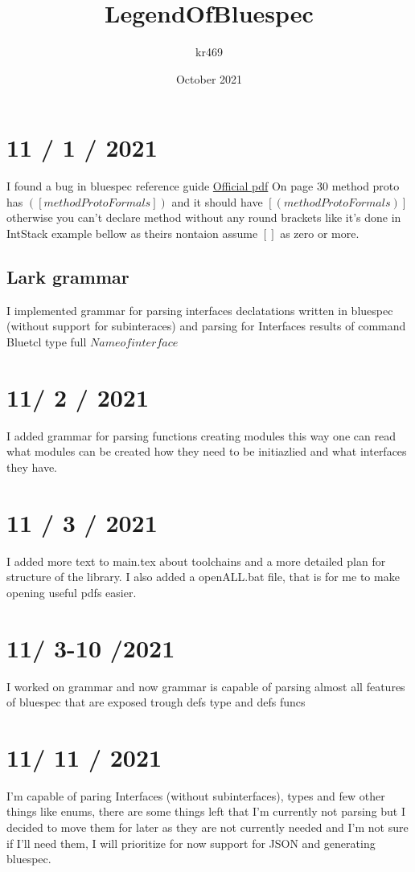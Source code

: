\documentclass{article}
\title{LegendOfBluespec}
\author{kr469 }
\date{October 2021}
\begin{document}
\maketitle

\section{11 / 1 / 2021}
    I found a bug in bluespec reference guide
    \hyperlink{https://github.com/BSVLang/Main/blob/master/Language_Spec/bsv-reference-guide.pdf}{Official pdf}
    On page 30 method proto has $([ methodProtoFormals ])$ 
    and it should have $[( methodProtoFormals)]$ 
    otherwise you can't declare method without any round brackets like it's done in IntStack example bellow
    as theirs nontaion assume $[]$ as zero or more. 

    \subsection{Lark grammar}
         I implemented grammar for parsing interfaces declatations written in bluespec (without support for subinteraces)
         and parsing for Interfaces results of command Bluetcl type full \( Name of interface \)

\section{11/ 2 / 2021}
    I added grammar for parsing functions creating modules this way one can 
    read what modules can be created how they need to be initiazlied and what interfaces they have.  

\section{11 / 3 / 2021}
    I added more text to main.tex about toolchains and a more detailed plan for structure of the library. I also added a openALL.bat file, that is for me to make opening useful pdfs easier.

\section{11/ 3-10 /2021}
    I worked on grammar and now grammar is capable of parsing almost all features of bluespec that are exposed trough defs type and defs funcs 
\section{11/ 11 / 2021}
    I'm capable of paring Interfaces (without subinterfaces), types and few other things like enums, there are some things left that I'm currently not parsing but I decided to move them for later as they are not currently needed and I'm not sure if I'll need them, I will prioritize for now support for JSON and generating bluespec.
\end{document}
